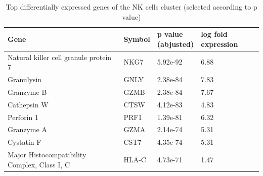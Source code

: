\documentclass[11pt,a4paper]{article}
\begin{document}


\begin{table}
    \begin{tabular}{ | l | l | l | l |}
    \hline
    \rowcolor{Gainsboro!60}

    Gene & Symbol & \makecell{p value \\ (abjusted)} & log fold expression  \\ \hline
    Natural killer cell granule protein 7 & NKG7 & 5.92e-92 & 6.88 \\ \hline
    Granulysin & GNLY & 2.38e-84 & 7.83  \\ \hline
    Granzyme B & GZMB & 2.38e-84 & 7.67 \\ \hline
    Cathepsin W & CTSW & 4.12e-83 & 4.83 \\ \hline
    Perforin 1 & PRF1 & 1.39e-81 & 6.32 \\ \hline
    Granzyme A & GZMA & 2.14e-74 & 5.31 \\ \hline
    Cystatin F & CST7 & 4.35e-74 & 5.31 \\ \hline
    Major Histocompatibility Complex, Class I, C & HLA-C & 4.73e-71 & 1.47 \\ \hline

    \end{tabular}

    \caption{Top differentially expressed genes of the NK cells cluster (selected according to p value)}
\end{table}
\end{document}
